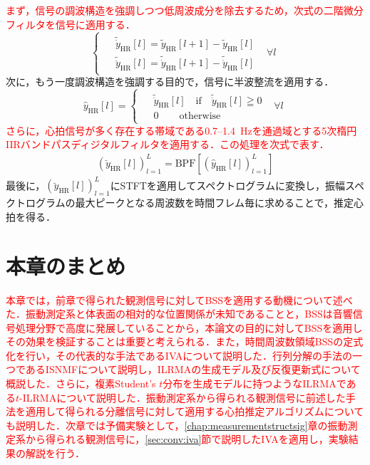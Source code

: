 \textcolor{red}{まず，信号の調波構造を強調しつつ低周波成分を除去するため，次式の二階微分フィルタを信号に適用する．}
\begin{equation} 
    \begin{cases}
        \begin{split}
        & \tilde{\dot{y}}_\mathrm{HR}[l]=\tilde{y}_\mathrm{HR}[l+1]-\tilde{y}_\mathrm{HR}[l] \\
        & \tilde{\ddot{y}}_\mathrm{HR}[l]=\tilde{\dot{y}}_\mathrm{HR}[l+1]-\tilde{\dot{y}}_\mathrm{HR}[l]
        \end{split}                         &   \forall{l}
    \end{cases}
\end{equation}
次に，もう一度調波構造を強調する目的で，信号に半波整流を適用する．
\begin{equation} 
\hat{y}_{\mathrm{HR}}[l] =
    \begin{cases}
        \begin{split}
        & \tilde{\ddot{y}}_\mathrm{HR}[l]\quad \mathrm{if}\quad \tilde{\ddot{y}}_\mathrm{HR}[l]\geqq0 \\
        & 0\hspace{25pt} \mathrm{otherwise}
        \end{split}                         &   \forall{l}
    \end{cases}
\end{equation}
\textcolor{red}{さらに，心拍信号が多く存在する帯域である0.7--1.4~Hzを通過域とする5次楕円IIRバンドパスディジタルフィルタを適用する．この処理を次式で表す．}
\begin{align}
    \left(\breve{y}_{\mathrm{HR}}[l]\right)_{l=1}^{L}=\mathrm{BPF}\left[\left(\hat{y}_{\mathrm{HR}}[l]\right)_{l=1}^{L}\right]
\end{align} \label{eq:bpf}
最後に，$( \breve{y}_{\mathrm{HR}}[l] )_{l=1}^L$にSTFTを適用してスペクトログラムに変換し，振幅スペクトログラムの最大ピークとなる周波数を時間フレム毎に求めることで，推定心拍を得る．

\section{本章のまとめ}
\label{sec:conv:conclusion3}
\textcolor{red}{本章では，前章で得られた観測信号に対してBSSを適用する動機について述べた．振動測定系と体表面の相対的な位置関係が未知であることと，BSSは音響信号処理分野で高度に発展していることから，本論文の目的に対してBSSを適用しその効果を検証することは重要と考えられる．また，時間周波数領域BSSの定式化を行い，その代表的な手法であるIVAについて説明した．行列分解の手法の一つであるISNMFについて説明し，ILRMAの生成モデル及び反復更新式について概説した．さらに，複素Student's $t$分布を生成モデルに持つようなILRMAである$t$-ILRMAについて説明した．振動測定系から得られる観測信号に前述した手法を適用して得られる分離信号に対して適用する心拍推定アルゴリズムについても説明した．次章では予備実験として，\ref{chap:measurementstructsig}章の振動測定系から得られる観測信号に，\ref{sec:conv:iva}節で説明したIVAを適用し，実験結果の解説を行う．}


